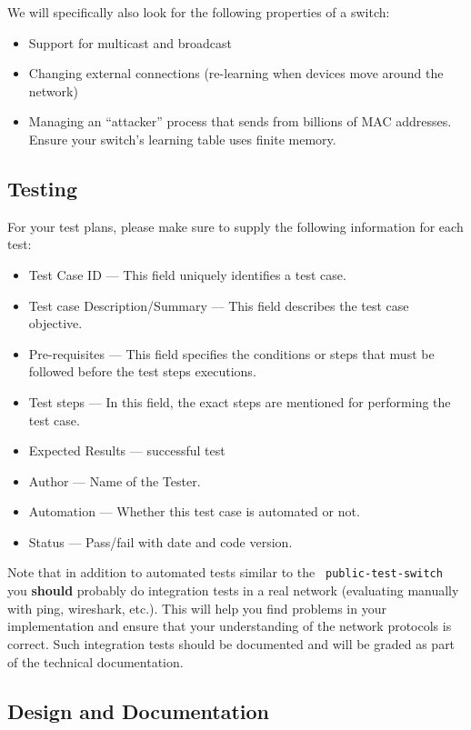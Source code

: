 \documentclass{article}
\begin{document}
We will specifically also look for the following properties of a switch:
\begin{itemize}
\item Support for multicast and broadcast
\item Changing external connections (re-learning when devices move around the network)
\item Managing an ``attacker'' process that sends from billions of MAC
  addresses.  Ensure your switch's learning table uses finite memory.
\end{itemize}

\subsection{Testing}

For your test plans, please make sure to supply the
following information for each test:

\begin{itemize}
  \item Test Case ID --- This field uniquely identifies a test case.
  \item Test case Description/Summary --- This field describes the test case objective.
  \item Pre-requisites --- This field specifies the conditions or steps that must be followed before the test steps executions.
  \item Test steps --- In this field, the exact steps are mentioned for performing the test case.
  \item Expected Results --- successful test
  \item Author --- Name of the Tester.
  \item Automation --- Whether this test case is automated or not.
  \item Status --- Pass/fail with date and code version.
\end{itemize}

Note that in addition to automated tests similar to the {\tt
  public-test-switch} you {\bf should} probably do integration tests
in a real network (evaluating manually with ping, wireshark, etc.).
This will help you find problems in your implementation and ensure
that your understanding of the network protocols is correct. Such
integration tests should be documented and will be graded as part of
the technical documentation.


\subsection{Design and Documentation}
\end{document}
